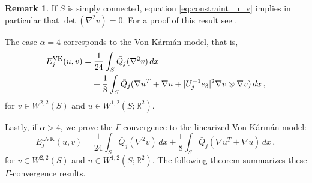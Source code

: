 \documentclass{article}
\theoremstyle{plain}
\theoremstyle{plain}
\theoremstyle{plain}
\theoremstyle{plain}
\theoremstyle{plain}
\theoremstyle{definition}
\newtheorem{remark}[teo]{Remark}
\theoremstyle{definition}
\renewcommand{\r}{\mathbb{R}}
\DeclareMathOperator{\VK}{VK}
\DeclareMathOperator{\LVK}{LVK}
\begin{document}
\begin{remark}\label{remark:determinant_zero}
    If $S$ is simply connected, equation \eqref{eq:constraint_u_v} implies in particular that $\det(\nabla^2 v) = 0$. For a proof of this result see  \cite[Proposition 9]{FRIESECKE2006}. 
\end{remark}

The case $\alpha = 4$ corresponds to the Von K\'arm\'an model, that is,
\begin{align}
    E^{\VK}_j(u, v) & =
        \dfrac{1}{24}\displaystyle\int_S \bar Q_j(\nabla^2 v) \, dx \\
        & \hphantom{=} \, \, + \dfrac{1}{8}\displaystyle\int_S \bar Q_j(\nabla u^T + \nabla u + |U^{-1}_je_3|^2 \nabla v \otimes \nabla v) \, dx\,,
\end{align}
for $v \in W^{2,2}(S)$ and $u \in W^{1,2}(S; \r^2)$.

Lastly, if $\alpha > 4$, we prove the $\Gamma$-convergence to the linearized Von K\'arm\'an model:
\[
    E^{\LVK}_j(u, v) = \dfrac{1}{24} \displaystyle\int_S \bar Q_j(\nabla^2 v) \, dx + \dfrac{1}{8}\displaystyle\int_S \bar Q_j(\nabla u^T + \nabla u) \, dx \,,
\]
for $v \in W^{2,2}(S)$ and $u \in W^{1,2}(S; \r^2)$. The following theorem summarizes these $\Gamma$-convergence results.
\end{document}
